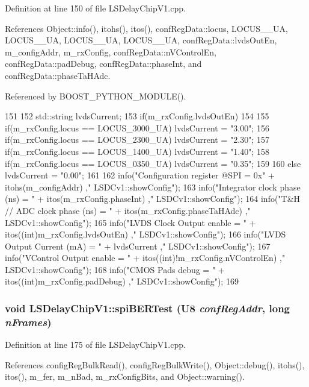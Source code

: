 Definition at line 150 of file LSDelayChipV1.cpp.

References Object::info(), itohs(), itos(), confRegData::locus, LOCUS\_\_\-UA, LOCUS\_\_\-UA, LOCUS\_\_\-UA, LOCUS\_\_\-UA, confRegData::lvdsOutEn, m\_\-configAddr, m\_\-rxConfig, confRegData::nVControlEn, confRegData::padDebug, confRegData::phaseInt, and confRegData::phaseTaHAdc.

Referenced by BOOST\_\-PYTHON\_\-MODULE().


\begin{DoxyCode}
151 {
152     std::string lvdsCurrent;    
153     if(m_rxConfig.lvdsOutEn)
154     {
155         if(m_rxConfig.locus == LOCUS_3000_UA) lvdsCurrent = "3.00";
156         if(m_rxConfig.locus == LOCUS_2300_UA) lvdsCurrent = "2.30";
157         if(m_rxConfig.locus == LOCUS_1400_UA) lvdsCurrent = "1.40";
158         if(m_rxConfig.locus == LOCUS_0350_UA) lvdsCurrent = "0.35";     
159     }
160     else lvdsCurrent = "0.00";
161     
162     info("Configuration register @SPI = 0x" + itohs(m_configAddr)              ,"
      LSDCv1::showConfig");
163     info("Integrator clock phase (ns) = " + itos(m_rxConfig.phaseInt)          ,"
      LSDCv1::showConfig");
164     info("T&H // ADC clock phase (ns) = " + itos(m_rxConfig.phaseTaHAdc)       ,"
      LSDCv1::showConfig");   
165     info("LVDS Clock Output enable    = " + itos((int)m_rxConfig.lvdsOutEn)    ,"
      LSDCv1::showConfig");
166     info("LVDS Output Current (mA)    = " + lvdsCurrent                        ,"
      LSDCv1::showConfig");
167     info("VControl Output enable      = " + itos((int)!m_rxConfig.nVControlEn) ,"
      LSDCv1::showConfig");
168     info("CMOS Pads debug             = " + itos((int)m_rxConfig.padDebug)     ,"
      LSDCv1::showConfig");
169 }
\end{DoxyCode}
\hypertarget{classLSDelayChipV1_ad0ed8d0797c985d7595fbe56f0da1996}{
\subsubsection[{spiBERTest}]{\setlength{\rightskip}{0pt plus 5cm}void LSDelayChipV1::spiBERTest ({\bf U8} {\em confRegAddr}, \/  long {\em nFrames})}}
\label{classLSDelayChipV1_ad0ed8d0797c985d7595fbe56f0da1996}


Definition at line 175 of file LSDelayChipV1.cpp.

References configRegBulkRead(), configRegBulkWrite(), Object::debug(), itohs(), itos(), m\_\-fer, m\_\-nBad, m\_\-rxConfigBits, and Object::warning().

